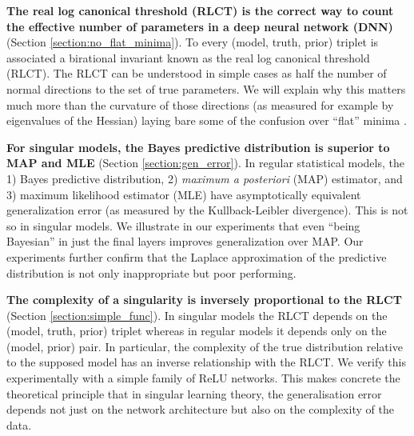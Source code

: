 \documentclass{article} %
\begin{document}
\textbf{The real log canonical threshold (RLCT) is the correct way to count the effective number of parameters in a deep neural network (DNN)} (Section \ref{section:no_flat_minima}). 
    To every (model, truth, prior) triplet is associated a birational invariant known as the real log canonical threshold (RLCT). The RLCT can be understood in simple cases as half the number of normal directions to the set of true parameters. We will explain why this matters much more than the curvature of those directions (as measured for example by eigenvalues of the Hessian) laying bare some of the confusion over ``flat'' minima \citep{chaudhari2019entropy, smith2017bayesian, jastrzkebski2017three, Zhang:2018MolPh.116.3214Z}.

\textbf{For singular models, the Bayes predictive distribution is superior to MAP and MLE} (Section \ref{section:gen_error}). In regular statistical models,  the 1) Bayes predictive distribution, 2) \textit{maximum a posteriori} (MAP) estimator, and 3) maximum likelihood estimator (MLE) have asymptotically equivalent generalization error (as measured by the Kullback-Leibler divergence). This is not so in singular models. We illustrate in our experiments that even ``being Bayesian'' in just the final layers improves generalization over MAP. Our experiments further confirm that the Laplace approximation of the predictive distribution \citet{le_bayesian_2018,zhang_energyentropy_2018} is not only inappropriate but poor performing.

\textbf{The complexity of a singularity is inversely proportional to the RLCT} (Section \ref{section:simple_func}). In singular models the RLCT depends on the (model, truth, prior) triplet whereas in regular models it depends only on the (model, prior) pair. In particular, the complexity of the true distribution relative to the supposed model has an inverse relationship with the RLCT. We verify this experimentally with a simple family of ReLU networks. This makes concrete the theoretical principle that in singular learning theory, the generalisation error depends not just on the network architecture but also on the complexity of the data. %
\end{document}

